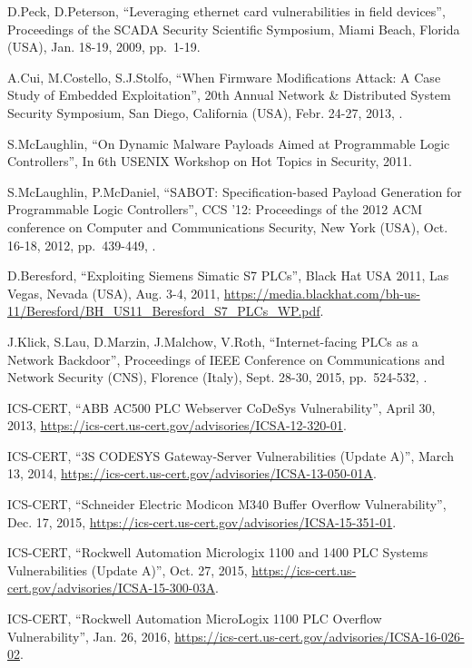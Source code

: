 \begin{thebibliography}{99}
D.Peck, D.Peterson,
``Leveraging ethernet card vulnerabilities in field devices'',
Proceedings of the SCADA Security Scientific Symposium,
Miami Beach, Florida (USA), Jan. 18-19, 2009,
pp.\ 1-19.

A.Cui, M.Costello, S.J.Stolfo,
``When Firmware Modifications Attack: A Case Study of Embedded Exploitation'',
20th Annual Network \& Distributed System Security Symposium,
San Diego, California (USA), Febr. 24-27, 2013,
.

S.McLaughlin,
``On Dynamic Malware Payloads Aimed at Programmable Logic Controllers'',
In 6th USENIX Workshop on Hot Topics in Security,
2011.

S.McLaughlin, P.McDaniel,
``SABOT: Specification-based Payload Generation for Programmable Logic Controllers'',
CCS '12: Proceedings of the 2012 ACM conference on Computer and Communications Security,
New York (USA), Oct. 16-18, 2012,
pp.\ 439-449,
.

D.Beresford,
``Exploiting Siemens Simatic S7 PLCs'',
Black Hat USA 2011,
Las Vegas, Nevada (USA), Aug. 3-4, 2011,
\url{https://media.blackhat.com/bh-us-11/Beresford/BH_US11_Beresford_S7_PLCs_WP.pdf}.

J.Klick, S.Lau, D.Marzin, J.Malchow, V.Roth,
``Internet-facing PLCs as a Network Backdoor'',
Proceedings of IEEE Conference on Communications and Network Security (CNS),
Florence (Italy), Sept. 28-30, 2015,
pp.\ 524-532,
.

ICS-CERT,
``ABB AC500 PLC Webserver CoDeSys Vulnerability'',
April 30, 2013,
\url{https://ics-cert.us-cert.gov/advisories/ICSA-12-320-01}.

ICS-CERT,
``3S CODESYS Gateway-Server Vulnerabilities (Update A)'',
March 13, 2014,
\url{https://ics-cert.us-cert.gov/advisories/ICSA-13-050-01A}.

ICS-CERT,
``Schneider Electric Modicon M340 Buffer Overflow Vulnerability'',
Dec. 17, 2015,
\url{https://ics-cert.us-cert.gov/advisories/ICSA-15-351-01}.

ICS-CERT,
``Rockwell Automation Micrologix 1100 and 1400 PLC Systems Vulnerabilities (Update A)'',
Oct. 27, 2015,
\url{https://ics-cert.us-cert.gov/advisories/ICSA-15-300-03A}.

ICS-CERT,
``Rockwell Automation MicroLogix 1100 PLC Overflow Vulnerability'',
Jan. 26, 2016,
\url{https://ics-cert.us-cert.gov/advisories/ICSA-16-026-02}.


\end{thebibliography}
